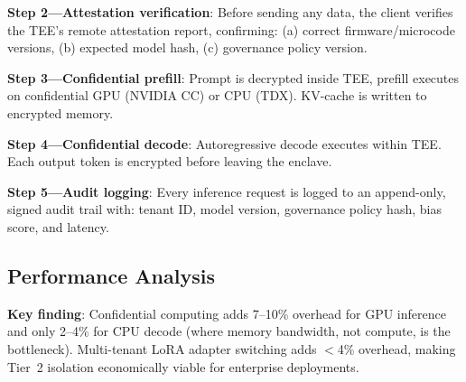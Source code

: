\documentclass[conference,10pt]{IEEEtran}
\begin{document}
\textbf{Step 2---Attestation verification}: Before sending any data, the client verifies the TEE's remote attestation report, confirming: (a) correct firmware/microcode versions, (b) expected model hash, (c) governance policy version.

\textbf{Step 3---Confidential prefill}: Prompt is decrypted inside TEE, prefill executes on confidential GPU (NVIDIA CC) or CPU (TDX). KV-cache is written to encrypted memory.

\textbf{Step 4---Confidential decode}: Autoregressive decode executes within TEE. Each output token is encrypted before leaving the enclave.

\textbf{Step 5---Audit logging}: Every inference request is logged to an append-only, signed audit trail with: tenant ID, model version, governance policy hash, bias score, and latency.

\subsection{Performance Analysis}

\begin{table}[!htbp]
\caption{Confidential vs.\ Non-Confidential Inference (Llama-70B)}
\label{tab:perf}
\centering\scriptsize
{}
\end{table}

\textbf{Key finding}: Confidential computing adds 7--10\% overhead for GPU inference and only 2--4\% for CPU decode (where memory bandwidth, not compute, is the bottleneck). Multi-tenant LoRA adapter switching adds $<$4\% overhead, making Tier~2 isolation economically viable for enterprise deployments.
\end{document}
